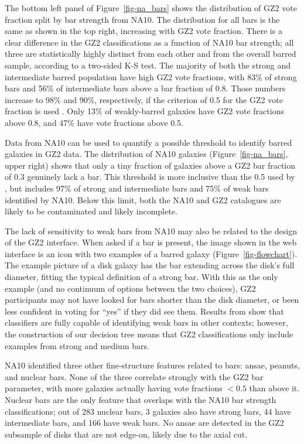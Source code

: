 \documentclass[useAMS,usenatbib]{mn2e}
\begin{document}
The bottom left panel of Figure~\ref{fig-na_bars} shows the distribution of GZ2 vote fraction split by bar strength from NA10. The distribution for all bars is the same as shown in the top right, increasing with GZ2 vote fraction. There is a clear difference in the GZ2 classifications as a function of NA10 bar strength; all three are statistically highly distinct from each other and from the overall barred sample, according to a two-sided K-S test. The majority of both the strong and intermediate barred population have high GZ2 vote fractions, with 83\% of strong bars and 56\% of intermediate bars above a bar fraction of 0.8. Those numbers increase to 98\% and 90\%, respectively, if the criterion of 0.5 for the GZ2 vote fraction is used \citep{mas11c}. Only 13\% of weakly-barred galaxies have GZ2 vote fractions above 0.8, and 47\% have vote fractions above 0.5. 

Data from NA10 can be used to quantify a possible threshold to identify barred galaxies in GZ2 data. The distribution of NA10 galaxies (Figure~\ref{fig-na_bars}, upper right) shows that only a tiny fraction of galaxies above a GZ2 bar fraction of 0.3 genuinely lack a bar. This threshold is more inclusive than the 0.5 used by \citet{mas11c}, but includes 97\% of strong and intermediate bars and 75\% of weak bars identified by NA10. Below this limit, both the NA10 and GZ2 catalogues are likely to be contaminated and likely incomplete. 

The lack of sensitivity to weak bars from NA10 may also be related to the design of the GZ2 interface. When asked if a bar is present, the image shown in the web interface is an icon with two examples of a barred galaxy (Figure~\ref{fig-flowchart}). The example picture of a disk galaxy has the bar extending across the disk's full diameter, fitting the typical definition of a strong bar. With this as the only example (and no continuum of options between the two choices), GZ2 participants may not have looked for bars shorter than the disk diameter, or been less confident in voting for ``yes'' if they did see them. Results from \citet{hoy11} show that classifiers are fully capable of identifying weak bars in other contexts; however, the construction of our decision tree means that GZ2 classifications only include examples from strong and medium bars. 

NA10 identified three other fine-structure features related to bars: ansae, peanuts, and nuclear bars. None of the three correlate strongly with the GZ2 bar parameter, with more galaxies actually having vote fractions $<0.5$ than above it. Nuclear bars are the only feature that overlaps with the NA10 bar strength classifications; out of 283 nuclear bars, 3 galaxies also have strong bars, 44 have intermediate bars, and 166 have weak bars. No ansae are detected in the GZ2 subsample of disks that are not edge-on, likely due to the axial cut. 
\end{document}
